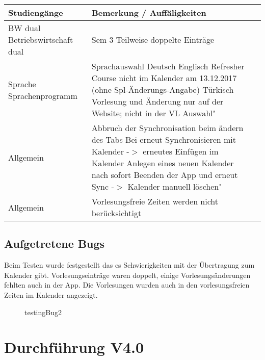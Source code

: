 \noindent%
\begin{tabularx}{\textwidth}{|p{}|X|X| }
\hline
\textbf{Studiengänge} &\textbf{Bemerkung / Auffäligkeiten}   \\ \hline 

BW dual  Betriebswirtschaft dual & 
Sem 3 Teilweise doppelte Einträge  \\ \hline

Sprache  Sprachenprogramm & 
Sprachauswahl Deutsch
Englisch Refresher Course nicht im Kalender am 13.12.2017 (ohne Spl-Änderungs-Angabe)
Türkisch Vorlesung und Änderung nur auf der Website; nicht in der VL Auswahl"   \\ \hline
Allgemein & Abbruch der Synchronisation beim ändern des Tabs 
Bei erneut Synchronisieren mit Kalender -$>$ erneutes Einfügen im Kalender 
Anlegen eines neuen Kalender nach sofort Beenden der App und erneut Sync
-$>$ Kalender manuell löschen"  \\ \hline
Allgemein & Vorlesungsfreie Zeiten werden nicht berücksichtigt  \\ \hline
\end{tabularx}
\newpage
\subsection{Aufgetretene Bugs}
Beim Testen wurde festgestellt das es Schwierigkeiten mit der Übertragung zum Kalender gibt. Vorlesungseinträge waren doppelt, einige Vorlesungsänderungen fehlten auch in der App. Die Vorlesungen wurden auch in den vorlesungsfreien Zeiten im Kalender angezeigt. \newline
 
\begin{figure}[H]
	\centering
	\caption{testingBug2}
	\label{fig1}
\end{figure}

\section{Durchführung V4.0}
